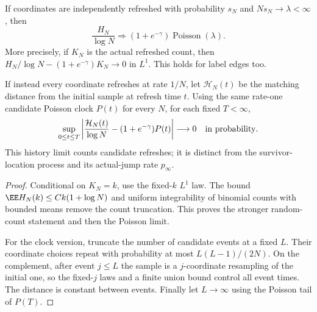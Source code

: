 \documentclass[11pt,letterpaper]{article}
\begin{document}
\begin{corollary}
\label{cor:poisson-history-limit}
If coordinates are independently refreshed with probability $s_N$
and $Ns_N\to\lambda<\infty$, then
\[
 \frac{H_N}{\log N}\Longrightarrow
             (1+e^{-\gamma})\operatorname{Poisson}(\lambda).
\]
More precisely, if $K_N$ is the actual refreshed count, then
$H_N/\log N-(1+e^{-\gamma})K_N\to0$ in $L^1$.
This holds for label edges too.

If instead every coordinate refreshes at rate $1/N$, let
$\mathcal H_N(t)$ be the matching distance from the initial sample
at refresh time $t$. Using the same rate-one candidate Poisson clock
$P(t)$ for every $N$, for each fixed $T<\infty$,
\[
 \sup_{0\le t\le T}
 \left|\frac{\mathcal H_N(t)}{\log N}
                    -(1+e^{-\gamma})P(t)\right|
                 \longrightarrow0\quad\hbox{in probability}.
\]
This history limit counts candidate refreshes; it is distinct from
the survivor-location process and its actual-jump rate $p_\infty$.
\end{corollary}
\begin{proof}
Conditional on $K_N=k$, use the fixed-$k$ $L^1$ law. The bound
$\EE H_N(k)\le Ck(1+\log N)$ and uniform integrability of binomial
counts with bounded means remove the count truncation. This proves
the stronger random-count statement and then the Poisson limit.

For the clock version, truncate the number of candidate events at
a fixed $L$. Their coordinate choices repeat with probability at
most $L(L-1)/(2N)$. On the complement, after event $j\le L$ the
sample is a $j$-coordinate resampling of the initial one, so the
fixed-$j$ laws and a finite union bound control all event times.
The distance is constant between events. Finally let $L\to\infty$
using the Poisson tail of $P(T)$.
\end{proof}
\end{document}
